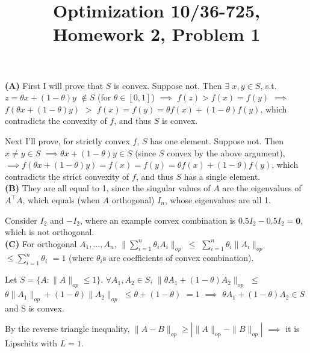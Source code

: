 \documentclass{article}
\title{Optimization 10/36-725, 
        Homework 2, Problem 1}
\author{}
\date{}
\begin{document}
\maketitle
\vspace{-6mm}

\textbf{(A)} First I will prove that $S$ is convex. Suppose not. Then $\exists$
$x,y \in S$, s.t. $z = \theta x + (1 - \theta) y$ $\not\in S$ (for $\theta \in
[0,1]$) $\implies$ $f(z) > f(x) = f(y)$ $\implies$ $f(\theta x + (1 -
\theta)y)$ $>$ $f(x) = f(y) = \theta f(x) + (1-\theta)f(y)$, which contradicts
the convexity of $f$, and thus $S$ is convex.

Next I'll prove, for strictly convex $f$, $S$ has one element. Suppose not.
Then $x \neq y \in S$ $\implies \theta x + (1 - \theta)y \in S$ (since $S$
convex by the above argument), $\implies f(\theta x + (1-\theta)y) = f(x) =
f(y) = \theta f(x) + (1-\theta)f(y)$, which contradicts the strict convexity of
$f$, and thus $S$ has a single element.\\


\textbf{(B)} They are all equal to 1, since the singular values of $A$ are the
eigenvalues of $A^{\top}A$, which equals (when $A$ orthogonal) $I_n$, whose
eigenvalues are all 1.

Consider $I_2$ and $-I_2$, where an example convex combination is $0.5 I_2 -
0.5I_2 = \mathbf{0}$, which is not orthogonal.\\


\textbf{(C)} For orthogonal $A_1,\ldots,A_n$, $\| \sum_{i=1}^n \theta_i A_i
\|_{op}$ $\leq$ $\sum_{i=1}^n \theta_i \| A_i \|_{op}$ $\leq \sum_{i=1}^n
\theta_i$ $= 1$ (where $\theta_i$s are coefficients of convex combination).

Let $S = \{A : \|A\|_{op} \leq 1 \}$. $\forall A_1, A_2 \in S$, $\|\theta A_1 +
(1-\theta)A_2\|_{op}$ $\leq$ $\theta \|A_1\|_{op} + (1-\theta)\|A_2\|_{op}$
$\leq \theta + (1-\theta)$ $=1$ $\implies$ $\theta A_1 + (1-\theta)A_2 \in S$
and S is convex.

By the reverse triangle inequality, $\|A-B\|_{op} \geq \left| \|A\|_{op} -
\|B\|_{op} \right|$ $\implies$ it is Lipschitz with $L=1$.\\
\end{document}
